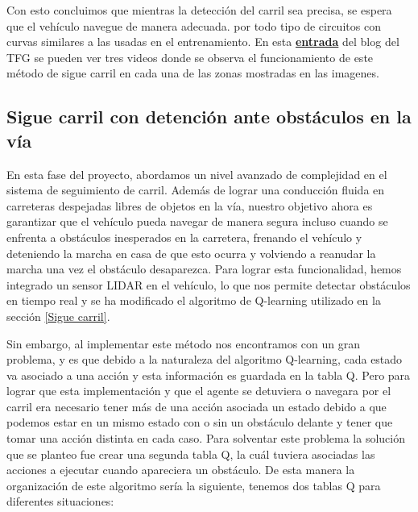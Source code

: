 \bigskip

Con esto concluimos que mientras la detección del carril sea precisa, se espera que el vehículo navegue de manera adecuada. por todo tipo de circuitos con curvas similares a las usadas en el entrenamiento. En esta \href{https://roboticslaburjc.github.io/2022-tfg-juancamilo-carmona/DEMOS/}{\textbf{entrada}} del blog del \ac{TFG} se pueden ver tres videos donde se observa el funcionamiento de este método de sigue carril en cada una de las zonas mostradas en las imagenes.


\subsection{Sigue carril con detención ante obstáculos en la vía}
\label{sigue carril con detención ante obstáculos en la vía}

En esta fase del proyecto, abordamos un nivel avanzado de complejidad en el sistema de seguimiento de carril. Además de lograr una conducción fluida en carreteras despejadas libres de objetos en la vía, nuestro objetivo ahora es garantizar que el vehículo pueda navegar de manera segura incluso cuando se enfrenta a obstáculos inesperados en la carretera, frenando el vehículo y deteniendo la marcha en casa de que esto ocurra y volviendo a reanudar la marcha una vez el obstáculo desaparezca. Para lograr esta funcionalidad, hemos integrado un sensor LIDAR en el vehículo, lo que nos permite detectar obstáculos en tiempo real y se ha modificado el algoritmo de Q-learning utilizado en la sección \ref{Sigue carril}.

\bigskip
Sin embargo, al implementar este método nos encontramos con un gran problema, y es que debido a la naturaleza del algoritmo Q-learning, cada estado va asociado a una acción y esta información es guardada en la tabla Q. Pero para lograr que esta implementación y que el agente se detuviera o navegara por el carril era necesario tener más de una acción asociada un estado debido a que podemos estar en un mismo estado con o sin un obstáculo delante y tener que tomar una acción distinta en cada caso. Para solventar este problema la solución que se planteo fue crear una segunda tabla Q, la cuál tuviera asociadas las acciones a ejecutar cuando apareciera un obstáculo. De esta manera la organización de este algoritmo sería la siguiente, tenemos dos tablas Q para diferentes situaciones:

